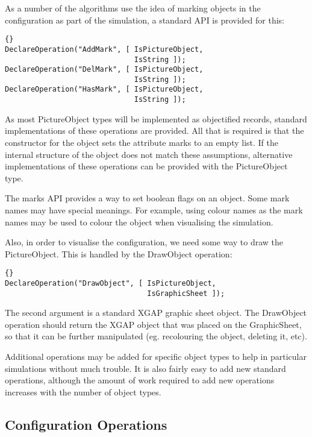 \documentclass[12pt,a4paper]{book}  %
\begin{document}
As a number of the algorithms use the idea of marking objects in the
configuration as part of the simulation, a standard API is provided
for this:

\begin{lstlisting}{}
DeclareOperation("AddMark", [ IsPictureObject,
                              IsString ]);
DeclareOperation("DelMark", [ IsPictureObject,
                              IsString ]);
DeclareOperation("HasMark", [ IsPictureObject,
                              IsString ]);
\end{lstlisting}

As most PictureObject types will be implemented as objectified
records, standard implementations of these operations are provided.
All that is required is that the constructor for the object sets the
attribute marks to an empty list.  If the internal structure of the
object does not match these assumptions, alternative implementations
of these operations can be provided with the PictureObject type.

The marks API provides a way to set boolean flags on an object.  Some
mark names may have special meanings.  For example, using colour names
as the mark names may be used to colour the object when visualising
the simulation.

Also, in order to visualise the configuration, we need some way to
draw the PictureObject.  This is handled by the DrawObject operation:

\begin{lstlisting}{}
DeclareOperation("DrawObject", [ IsPictureObject,
                                 IsGraphicSheet ]);
\end{lstlisting}

The second argument is a standard XGAP graphic sheet object.  The
DrawObject operation should return the XGAP object that was placed on
the GraphicSheet, so that it can be further manipulated
(eg. recolouring the object, deleting it, etc).

Additional operations may be added for specific object types to help
in particular simulations without much trouble.  It is also fairly
easy to add new standard operations, although the amount of work
required to add new operations increases with the number of object
types.

\subsection{Configuration Operations}
\end{document}
